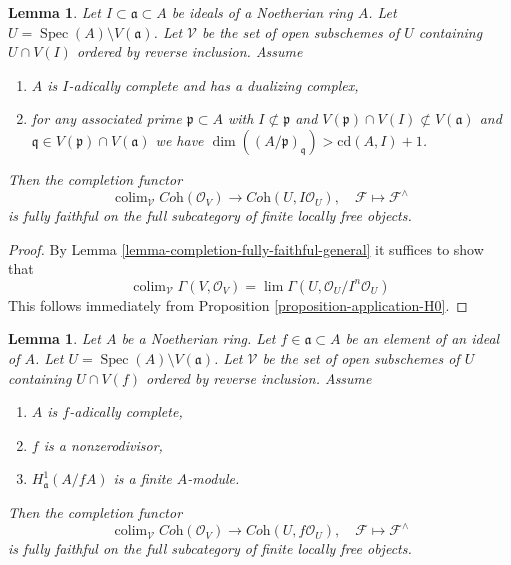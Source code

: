 \documentclass{stacks-project}
\theoremstyle{plain}
\newtheorem{lemma}[subsection]{Lemma}
\theoremstyle{definition}
\theoremstyle{remark}
\numberwithin{equation}{subsection}
\def\lim{\mathop{\mathrm{lim}}\nolimits}
\def\colim{\mathop{\mathrm{colim}}\nolimits}
\def\Spec{\mathop{\mathrm{Spec}}}
\begin{document}
\begin{lemma}
\label{lemma-fully-faithful-general}
Let $I \subset \mathfrak a \subset A$ be ideals of a Noetherian ring $A$.
Let $U = \Spec(A) \setminus V(\mathfrak a)$. Let $\mathcal{V}$ be
the set of open subschemes of $U$ containing $U \cap V(I)$
ordered by reverse inclusion. Assume
\begin{enumerate}
\item $A$ is $I$-adically complete and has a dualizing complex,
\item for any associated prime
$\mathfrak p \subset A$ with
$I \not \subset \mathfrak p$ and
$V(\mathfrak p) \cap V(I) \not \subset V(\mathfrak a)$
and $\mathfrak q \in V(\mathfrak p) \cap V(\mathfrak a)$ we have
$\dim((A/\mathfrak p)_\mathfrak q) > \text{cd}(A, I) + 1$.
\end{enumerate}
Then the completion functor
$$
\colim_\mathcal{V} \textit{Coh}(\mathcal{O}_V)
\longrightarrow
\textit{Coh}(U, I\mathcal{O}_U),
\quad
\mathcal{F} \longmapsto \mathcal{F}^\wedge
$$
is fully faithful on the full subcategory of
finite locally free objects.
\end{lemma}

\begin{proof}
By Lemma \ref{lemma-completion-fully-faithful-general}
it suffices to show that
$$
\colim_\mathcal{V} \Gamma(V, \mathcal{O}_V) =
\lim \Gamma(U, \mathcal{O}_U/I^n\mathcal{O}_U)
$$
This follows immediately from Proposition \ref{proposition-application-H0}.
\end{proof}

\begin{lemma}
\label{lemma-fully-faithful-general-alternative}
Let $A$ be a Noetherian ring. Let $f \in \mathfrak a \subset A$
be an element of an ideal of $A$. Let $U = \Spec(A) \setminus V(\mathfrak a)$.
Let $\mathcal{V}$ be the set of open subschemes of $U$ containing $U \cap V(f)$
ordered by reverse inclusion. Assume
\begin{enumerate}
\item $A$ is $f$-adically complete,
\item $f$ is a nonzerodivisor,
\item $H^1_\mathfrak a(A/fA)$ is a finite $A$-module.
\end{enumerate}
Then the completion functor
$$
\colim_\mathcal{V} \textit{Coh}(\mathcal{O}_V)
\longrightarrow
\textit{Coh}(U, f\mathcal{O}_U),
\quad
\mathcal{F} \longmapsto \mathcal{F}^\wedge
$$
is fully faithful on the full subcategory of finite locally free objects.
\end{lemma}
\end{document}
